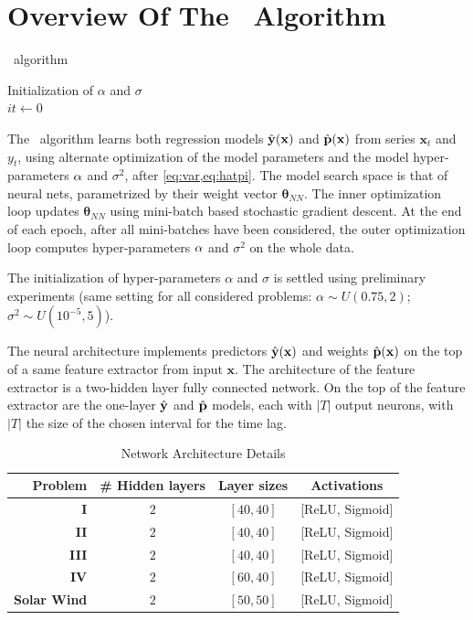 \section{Overview Of The \XX\ Algorithm}\label{sec:model}
\begin{algorithm}[H]
  \SetAlgoLined
   \caption{\XX\ algorithm}
   Initialization of $\alpha$ and $\sigma$\\
   $it \longleftarrow 0$ \;
\end{algorithm}
The \XX\ algorithm learns both regression models $\hat {\bf y}(\mathbf{x})$ and $\hat {\bf p}(\mathbf{x})$ from 
series $\mathbf{x}_t$ and $y_t$, using alternate optimization of the model parameters and the model 
hyper-parameters ${\bf \alpha}$ and $\sigma^2$, after \cref{eq:var,eq:hatpi}. 
The model search space is that of neural nets, parametrized by their weight vector $\boldsymbol{\theta}_{NN}$. 
The inner optimization loop updates $\boldsymbol{\theta}_{NN}$ using mini-batch based stochastic gradient descent. 
At the end of each epoch, after all mini-batches have been considered, the outer optimization loop 
computes hyper-parameters ${\bf \alpha}$ and $\sigma^2$ on the whole data. 
 
The initialization of hyper-parameters $\alpha$ and $\sigma$ is settled using preliminary 
experiments (same setting for all considered problems: 
$\alpha \sim U(0.75, 2)$; $\sigma^2 \sim U(10^{-5}, 5)$).

The neural architecture implements predictors $\hat {\bf y}(\mathbf{x})$ and weights $\hat {\bf p}(\mathbf{x})$ on 
the top of a same feature extractor from input $\mathbf{x}$. The architecture of the feature extractor is a 
two-hidden layer fully connected network. On the top of the feature extractor are the 
one-layer $\hat {\bf y}$ and $\hat {\bf p}$ models, each with $|T|$ output neurons, with $|T|$ the 
size of the chosen interval for the time lag.

\begin{table}[htbp]
  \caption{Network Architecture Details}\label{tab:arch_probs}
  \centering
  \begin{tabular}{ r c c c }
  \hline
  Problem &  \# Hidden layers & Layer sizes & Activations\\
  \hline
  \textbf{I} & $2$ & $[40, 40]$  & [ReLU, Sigmoid]\\
  \textbf{II} & $2$ & $[40, 40]$ & [ReLU, Sigmoid]\\
  \textbf{III} & $2$ & $[40, 40]$ & [ReLU, Sigmoid]\\
  \textbf{IV} & $2$ & $[60, 40]$ & [ReLU, Sigmoid]\\
  \textbf{Solar Wind} & $2$ & $[50, 50]$ & [ReLU, Sigmoid]\\
  \hline
  \end{tabular}
\end{table}


